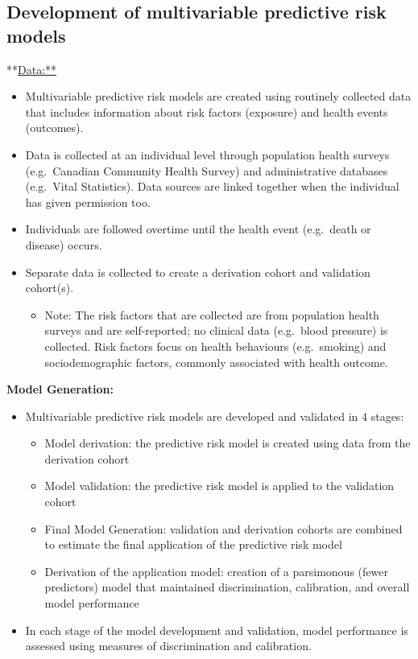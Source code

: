 \documentclass[]{book}
\providecommand{\tightlist}{%
  \setlength{\itemsep}{0pt}\setlength{\parskip}{0pt}}
\begin{document}
\subsection{Development of multivariable predictive risk
models}\label{development-of-multivariable-predictive-risk-models}

**\url{Data:**}

\begin{itemize}
\item
  Multivariable predictive risk models are created using routinely
  collected data that includes information about risk factors (exposure)
  and health events (outcomes).
\item
  Data is collected at an individual level through population health
  surveys (e.g.~Canadian Community Health Survey) and administrative
  databases (e.g.~Vital Statistics). Data sources are linked together
  when the individual has given permission too.
\item
  Individuals are followed overtime until the health event (e.g.~death
  or disease) occurs.
\item
  Separate data is collected to create a derivation cohort and
  validation cohort(s).

  \begin{itemize}
  \tightlist
  \item
    Note: The risk factors that are collected are from population health
    surveys and are self-reported; no clinical data (e.g.~blood
    pressure) is collected. Risk factors focus on health behaviours
    (e.g.~smoking) and sociodemographic factors, commonly associated
    with health outcome.
  \end{itemize}
\end{itemize}

\textbf{Model Generation:}

\begin{itemize}
\item
  Multivariable predictive risk models are developed and validated in 4
  stages:

  \begin{itemize}
  \tightlist
  \item
    Model derivation: the predictive risk model is created using data
    from the derivation cohort
  \item
    Model validation: the predictive risk model is applied to the
    validation cohort
  \item
    Final Model Generation: validation and derivation cohorts are
    combined to estimate the final application of the predictive risk
    model
  \item
    Derivation of the application model: creation of a parsimonous
    (fewer predictors) model that maintained discrimination,
    calibration, and overall model performance
  \end{itemize}
\item
  In each stage of the model development and validation, model
  performance is assessed using measures of discrimination and
  calibration.
\end{itemize}
\end{document}
